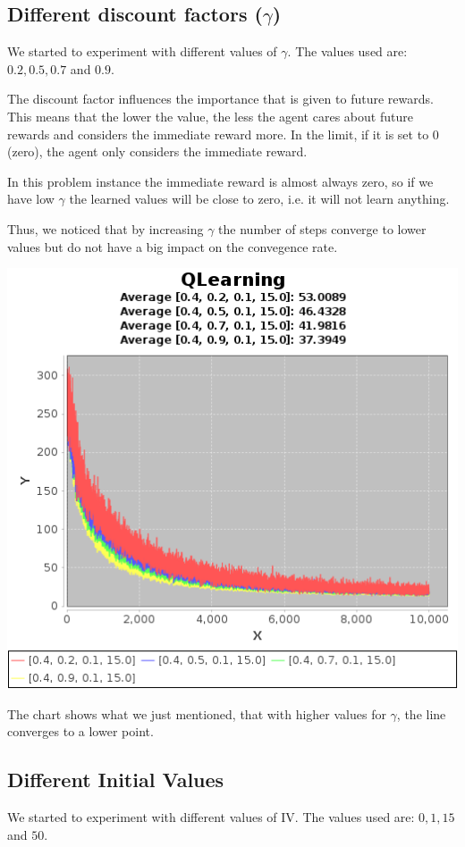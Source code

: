 \documentclass{article}
\begin{document}
\subsection{Different discount factors ($\gamma$)}
We started to experiment with different values of $\gamma$. The values used are:
$0.2, 0.5, 0.7$ and $0.9$. 

The discount factor influences the importance that is given to future rewards.
This means that the lower the value, the less the agent cares about future
rewards and considers the immediate reward more. In the limit, if it is set to $0$ (zero), the agent only considers the immediate reward.

In this problem instance the immediate reward is almost always zero, so if we
have low $\gamma$ the learned values will be close to zero, i.e. it will not
learn anything. 

Thus, we noticed that by increasing $\gamma$ the number of steps converge to
lower values but do not have a big impact on the convegence rate.

\includegraphics[]{res/alpha_04_gama_02_to_09_epsilon_01_IV_15.png}

The chart shows what we just mentioned, that with higher values for $\gamma$, the line converges to a lower point.

\subsection{Different Initial Values}
We started to experiment with different values of IV. The values used are:
$0, 1, 15$ and $50$. 
\end{document}
